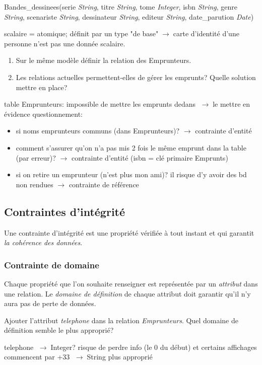 \documentclass[a4paper,11pt]{article}
\begin{document}
\begin{Form}
\begin{itemize}
Bandes\_dessinees(serie \emph{String}, titre \emph{String}, tome \emph{Integer}, isbn \emph{String}, genre \emph{String}, scenariste \emph{String}, dessinateur \emph{String}, editeur \emph{String}, date\_parution \emph{Date})
\end{itemize}
\begin{commentprof}
scalaire = atomique; définit par un type "de base"$\;\rightarrow\;$carte d'identité d'une personne n'est pas une donnée scalaire. 
\end{commentprof}
\begin{activite}
\begin{enumerate}
\item Sur le même modèle définir la relation des Emprunteurs.
\item Les relations actuelles permettent-elles de gérer les emprunts? Quelle solution mettre en place?
\end{enumerate}
\end{activite}
\begin{commentprof}
table Emprunteurs: impossible de mettre les emprunts dedans $\;\rightarrow\;$le mettre en évidence
questionnement:
\begin{itemize}
\item si noms emprunteurs communs (dans Emprunteurs)? $\rightarrow$ contrainte d'entité
\item comment s'assurer qu'on n'a pas mis 2 fois le même emprunt dans la table (par erreur)? $\rightarrow$ contrainte d'entité (isbn = clé primaire Emprunts)
\item si on retire un emprunteur (n'est plus mon ami)? il risque d'y avoir des bd non rendues $\rightarrow$ contrainte de référence
\end{itemize}
\end{commentprof}
\subsection{Contraintes d'intégrité}
Une contrainte d'intégrité est une propriété vérifiée à tout instant et qui garantit \emph{la cohérence des données}.
\subsubsection{Contrainte de domaine}
Chaque propriété que l'on souhaite renseigner est représentée par un \emph{attribut} dans une relation. Le \emph{domaine de définition} de chaque attribut doit garantir qu'il n'y aura pas de perte de données.
\begin{activite}
Ajouter l'attribut \emph{telephone} dans la relation \emph{Emprunteurs}. Quel domaine de définition semble le plus approprié?
\end{activite}
\begin{commentprof}
telephone $\;\rightarrow\;$Integer? risque de perdre info (le 0 du début) et certains affichages commencent par +33 $\;\rightarrow\;$String plus approprié


\end{commentprof}
\end{Form}
\end{document}
